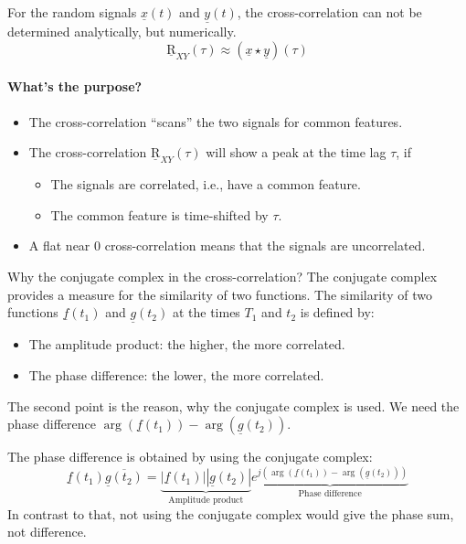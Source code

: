 \begin{refsection}
For the random signals $\underline{x}(t)$ and $\underline{y}(t)$, the cross-correlation can not be determined analytically, but numerically.
\begin{equation}
	\underline{\mathrm{R}}_{XY}(\tau) \approx \left(\underline{x} \star \underline{y}\right)(\tau)
\end{equation}

\paragraph{What's the purpose?}

\begin{itemize}
	\item The cross-correlation ``scans'' the two signals for common features.
	\item The cross-correlation $\underline{\mathrm{R}}_{XY}(\tau)$ will show a peak at the time lag $\tau$, if
	\begin{itemize}
		\item The signals are correlated, i.e., have a common feature.
		\item The common feature is time-shifted by $\tau$.
	\end{itemize}
	\item A flat near $0$ cross-correlation means that the signals are uncorrelated.
\end{itemize}

\begin{excursus}{Why the conjugate complex in the cross-correlation?}
	The conjugate complex provides a measure for the similarity of two functions. The similarity of two functions $\underline{f}(t_1)$ and $\underline{g}(t_2)$ at the times $T_1$ and $t_2$ is defined by:
	\begin{itemize}
		\item The amplitude product: the higher, the more correlated.
		\item The phase difference: the lower, the more correlated.
	\end{itemize}
	The second point is the reason, why the conjugate complex is used. We need the phase difference $\arg\left(\underline{f}(t_1)\right) - \arg\left(\underline{g}(t_2)\right)$.
	
	The phase difference is obtained by using the conjugate complex:
	\begin{equation}
		\underline{f}(t_1) \overline{\underline{g}(t_2)} = \underbrace{\left|\underline{f}(t_1)\right|\left|\underline{g}(t_2)\right|}_{\text{Amplitude product}} \underbrace{e^{j\left(\arg\left(\underline{f}(t_1)\right) - \arg\left(\underline{g}(t_2)\right)\right)}}_{\text{Phase difference}}
	\end{equation}
	In contrast to that, not using the conjugate complex would give the phase sum, not difference.
\end{excursus}


\end{refsection}
